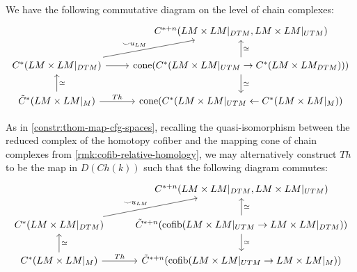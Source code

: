 \documentclass{scrartcl}
\theoremstyle{plain}
\theoremstyle{definition}
\newcommand{\cupp}{\mathbin{\smile}}
\DeclareMathOperator{\cone}{cone}
\DeclareMathOperator{\cofib}{cofib}
\newcommand{\quiso}{\simeq}
\newcommand{\from}{\leftarrow}
\begin{document}
We have the following commutative diagram on the level of chain complexes:
\begin{equation}
    \begin{tikzcd}\label{diag:Th-map-LM-2}
    & C^{*+n}(LM\times LM|_{DTM}, LM\times LM|_{UTM}) \\
    C^*(LM\times LM|_{DTM}) \rar \ar[ur, "\cupp u_{LM}"] & \cone(C^*(LM\times LM|_{UTM} \to C^*(LM\times LM_{DTM}))) \uar[swap, "\quiso"]\dar["\quiso"]\\
    \tilde C^*(LM\times LM|_M) \uar[swap, "\quiso"] \rar["Th"] & \cone(C^{*}(LM\times LM|_{UTM}\from C^*(LM\times LM|_{M}))
\end{tikzcd}
\end{equation}

As in \cref{constr:thom-map-cfg-spaces}, recalling the quasi-isomorphism between the reduced complex of the homotopy cofiber and the mapping cone of chain complexes from \cref{rmk:cofib-relative-homology}, we may alternatively construct $Th$ to be the map in $D(Ch(k))$ such that the following diagram commutes:
\begin{equation}\begin{tikzcd}\label{diag:Th-map-LM}
      & C^{*+n}(LM\times LM|_{DTM}, LM\times LM|_{UTM}) \\
      C^*(LM\times LM|_{DTM}) \ar[ur, "\cupp u_{LM}"] & \tilde C^{*+n}(\cofib(LM\times LM|_{UTM} \to LM\times LM|_{DTM})) \uar[swap, "\quiso"]\dar["\quiso"]\\
    C^*(LM\times LM|_M) \ar[u, swap, "\quiso"]\rar["Th"] & \tilde C^{*+n}(\cofib(LM\times LM|_{UTM}\to LM\times LM|_{M}))
\end{tikzcd}\end{equation}
\end{document}
